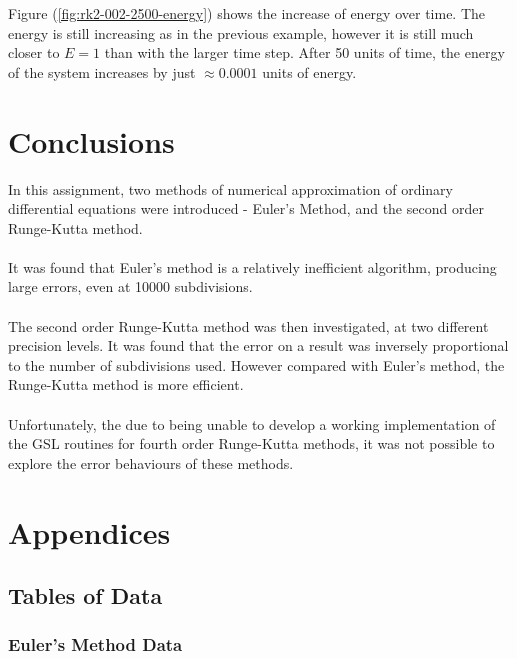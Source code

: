 \documentclass[pdf,color]{UoBnote}
\begin{document}
	Figure (\ref{fig:rk2-002-2500-energy}) shows the increase of energy over time. The energy is still increasing as in the previous example, however it is still much closer to $E = 1$ than with the larger time step. After 50 units of time, the energy of the system increases by just $\approx 0.0001$ units of energy.\\
			
\section{Conclusions}
In this assignment, two methods of numerical approximation of ordinary differential equations were introduced - Euler's Method, and the second order Runge-Kutta method.\\\\
It was found that Euler's method is a relatively inefficient algorithm, producing large errors, even at 10000 subdivisions.\\\\
The second order Runge-Kutta method was then investigated, at two different precision levels. It was found that the error on a result was inversely proportional to the number of subdivisions used. However compared with Euler's method, the Runge-Kutta method is more efficient.\\\\
Unfortunately, the due to being unable to develop a working implementation of the GSL routines for fourth order Runge-Kutta methods, it was not possible to explore the error behaviours of these methods.
\section{Appendices}

	\subsection{Tables of Data}
		\subsubsection{Euler's Method Data}
		
\end{document}
